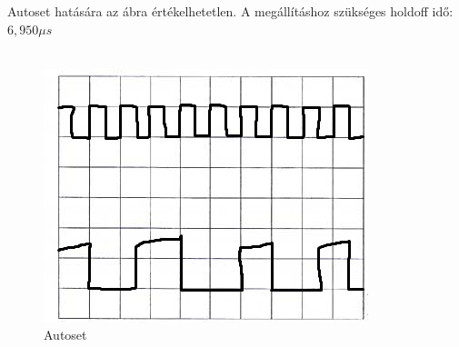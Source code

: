 \documentclass[10pt,a4paper]{article}
\begin{document}
\begin{enumerate}
			Autoset hatására az ábra értékelhetetlen. A megállításhoz szükséges holdoff idő: $6,950 \mu s$ \\\\\begin{figure}[hbtp]
			\centering
			\includegraphics[scale=0.5]{teljes/osc_autoset.jpg}
			\caption{Autoset}
			\end{figure}
					
		\end{enumerate}
\end{document}
